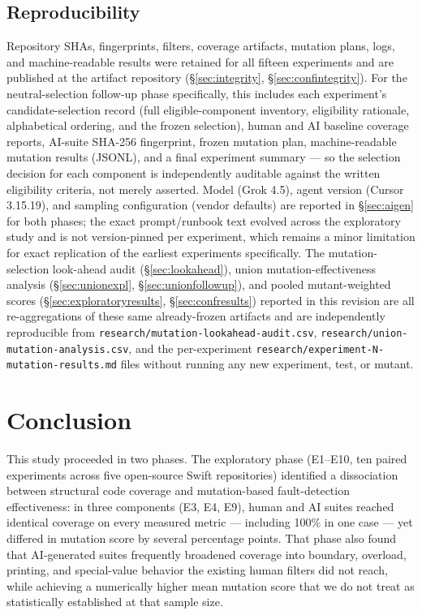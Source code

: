\documentclass[10pt,conference]{IEEEtran}
\begin{document}
\subsection{Reproducibility}
Repository SHAs, fingerprints, filters, coverage artifacts, mutation plans, logs, and machine-readable results were retained for all fifteen experiments and are published at the artifact repository (\S\ref{sec:integrity}, \S\ref{sec:confintegrity}). For the neutral-selection follow-up phase specifically, this includes each experiment's candidate-selection record (full eligible-component inventory, eligibility rationale, alphabetical ordering, and the frozen selection), human and AI baseline coverage reports, AI-suite SHA-256 fingerprint, frozen mutation plan, machine-readable mutation results (JSONL), and a final experiment summary — so the selection decision for each component is independently auditable against the written eligibility criteria, not merely asserted. Model (Grok 4.5), agent version (Cursor 3.15.19), and sampling configuration (vendor defaults) are reported in \S\ref{sec:aigen} for both phases; the exact prompt/runbook text evolved across the exploratory study and is not version-pinned per experiment, which remains a minor limitation for exact replication of the earliest experiments specifically. The mutation-selection look-ahead audit (\S\ref{sec:lookahead}), union mutation-effectiveness analysis (\S\ref{sec:unionexpl}, \S\ref{sec:unionfollowup}), and pooled mutant-weighted scores (\S\ref{sec:exploratoryresults}, \S\ref{sec:confresults}) reported in this revision are all re-aggregations of these same already-frozen artifacts and are independently reproducible from \texttt{research/mutation-lookahead-audit.csv}, \texttt{research/union-mutation-analysis.csv}, and the per-experiment \texttt{research/experiment-N-mutation-results.md} files without running any new experiment, test, or mutant.

\section{Conclusion}
This study proceeded in two phases. The exploratory phase (E1--E10, ten paired experiments across five open-source Swift repositories) identified a dissociation between structural code coverage and mutation-based fault-detection effectiveness: in three components (E3, E4, E9), human and AI suites reached identical coverage on every measured metric — including 100\% in one case — yet differed in mutation score by several percentage points. That phase also found that AI-generated suites frequently broadened coverage into boundary, overload, printing, and special-value behavior the existing human filters did not reach, while achieving a numerically higher mean mutation score that we do not treat as statistically established at that sample size.
\end{document}
